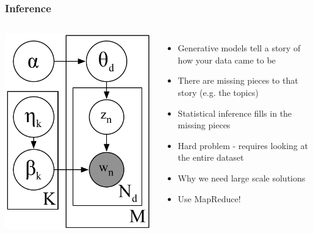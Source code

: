 \begin{frame}
	\frametitle{Inference}
	
	\begin{columns}

			\includegraphics[width=0.9\linewidth]{mrlda/lda_model}
			\begin{itemize}
				\item Generative models tell a story of how your data came to be
				\item There are missing pieces to that story (e.g. the topics)
				\item Statistical inference fills in the missing pieces
				\pause
				\item Hard problem - requires looking at the entire dataset
				\item Why we need large scale solutions
				\pause
				\item Use MapReduce!
			\end{itemize}
	
	\end{columns}


\end{frame}

